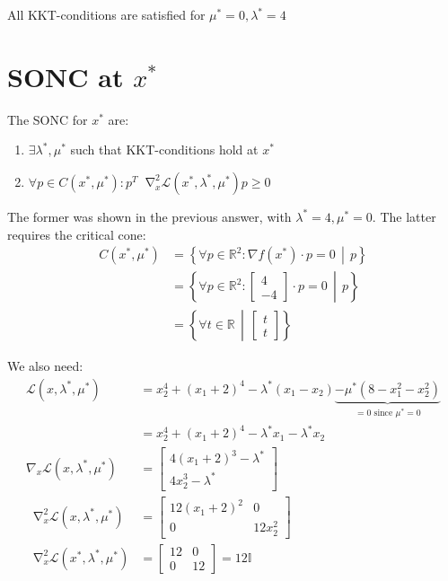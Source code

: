 \documentclass[oneside, a4paper]{book}
\newcommand*\Laplace{\mathop{}\!\mathbin\nabla^2}
\newcommand\br[1]{\left(#1\right)}
\begin{document}
All KKT-conditions are satisfied for $\mu^*=0, \lambda^* =4$

\section{SONC at $x^*$}

The SONC for $x^*$ are:
\begin{enumerate}
    \item $\exists \lambda^*, \mu^*$ such that KKT-conditions hold at $x^*$
    \item $\forall p\in C(x^*, \mu^*): p^T\Laplace_x \mathcal{L}(x^*,\lambda^*,\mu^*) p \geq 0$
\end{enumerate}

The former was shown in the previous answer, with $\lambda^* = 4, \mu^*=0$. The latter requires the critical cone:
\begin{align}
    C(x^*, \mu^*) &= \left\{ \forall p\in\mathds{R}^2: \nabla f(x^*) \cdot p = 0 \,\middle | \, p\right\}\\
    &= \left\{ \forall p\in\mathds{R}^2: \begin{bmatrix}4\\-4\end{bmatrix}  \cdot p = 0 \,\middle | \, p\right\}\\
    &= \left\{ \forall t\in\mathds{R}  \,\middle | \, \begin{bmatrix}t\\t\end{bmatrix} \right\}
\end{align}

We also need:
\begin{align}
    \mathcal{L}(x,\lambda^*,\mu^*) 
    &= 
    x_2^4 + \br{x_1+2}^4
    -\lambda^*\br{x_1 - x_2}
    \underbrace{- \mu^*\br{8 - x_1^2 - x_2^2}}_{=0 \text{ since } \mu^*=0}\\
    &=
    x_2^4 + \br{x_1+2}^4
    -\lambda^* x_1 -\lambda^* x_2\\
    \nabla_x \mathcal{L}(x,\lambda^*,\mu^*) &= 
    \begin{bmatrix}
        4(x_1+2)^3 - \lambda^*\\
        4x_2^3 - \lambda^*
    \end{bmatrix}\\
    \Laplace_x \mathcal{L}(x,\lambda^*,\mu^*) &= 
    \begin{bmatrix}
        12(x_1+2)^2 & 0\\
        0 & 12x_2^2
    \end{bmatrix}\\
    \Laplace_x \mathcal{L}(x^*,\lambda^*,\mu^*) &= 
    \begin{bmatrix}
        12 & 0\\
        0 & 12
    \end{bmatrix} = 12\mathds{I}
\end{align}
\end{document}
